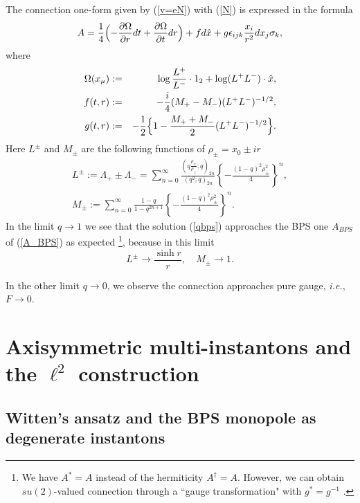 \documentclass[a4paper,10pt]{article}
\newcommand{\ie}{\textit{i.e.}}
\begin{document}
The connection one-form  given by (\ref{v=eN}) with (\ref{N}) is expressed in the formula
\begin{equation}
A=\frac{1}{4}\Bigl(-\frac{\partial\Omega}{\partial r}dt+\frac{\partial\Omega}{\partial t}dr\Bigr)+f d\hat{x}+g\epsilon_{ijk}\frac{x_i}{r^2}dx_j\sigma_k, \label{qbps}
\end{equation}
where
\begin{eqnarray}
\Omega(x_\mu)&:=&\log\frac{L^+}{L^-}\cdot 1_2+\log(L^+L^-)\cdot\hat{x},\label{Omega}\\
f(t,r)&:=&-\frac{i}{4}(M_+-M_-)(L^+L^-)^{-1/2},\label{f}\\
g(t,r)&:=&-\frac{1}{2}\Bigl\{1-\frac{M_++M_-}{2}(L^+L^-)^{-1/2}\Bigr\}\label{g}.
\end{eqnarray}
Here $L^\pm$ and $M_\pm$ are the following functions of $\rho_\pm=x_0\pm ir$ 
\begin{eqnarray}
L^\pm:=\Lambda_+\pm\Lambda_-=\sum^\infty_{n=0}\frac{(q\frac{\rho_\mp}{\rho_\pm};q)_{2n}}{(q^2;q)_{2n}}\left\{-\frac{(1-q)^2\rho_\pm^2}{4}\right\}^n, \label{Lpm}\\
M_\pm:=\sum^\infty_{n=0}\frac{1-q}{1-q^{2n+1}}\left\{-\frac{(1-q)^2\rho_\pm^2}{4}\right\}^n. \label{Mpm}
\end{eqnarray}
In the limit $q \to 1$ we see that the solution (\ref{qbps}) approaches the BPS one $A_{BPS}$ of (\ref{A_BPS}) as expected
\footnote[2]{We have $A^*=A$ instead of the hermiticity $A^\dagger=A.$
 However, we can obtain $su(2)$-valued connection through a ``gauge transformation" with $g^*=g^{-1}$ \cite{KN}.}, because in this limit
\begin{equation}
L^{\pm} \rightarrow \frac{\sinh{r}}{r}, \quad M_{\pm} \rightarrow 1.
\end{equation}


In the other limit $q \to 0$, we observe the connection approaches pure gauge, \ie, $F\to 0$.


\section{Axisymmetric multi-instantons and the $\ell^2$ construction}
\subsection{Witten's ansatz and the BPS monopole as degenerate instantons}
\end{document}
